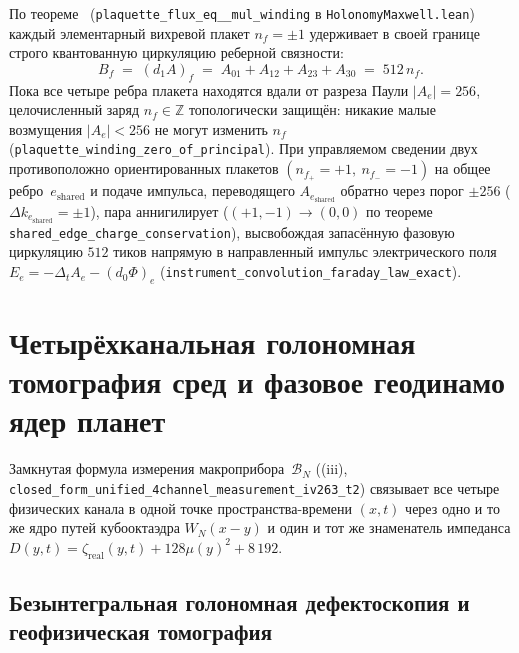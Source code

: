 По теореме~ (\texttt{plaquette\_\allowbreak flux\_\allowbreak eq\_\_\allowbreak mul\_\allowbreak winding} в \texttt{HolonomyMaxwell.lean}) каждый элементарный вихревой плакет $n_f = \pm 1$ удерживает в своей границе строго квантованную циркуляцию реберной связности:
\begin{equation}
\label{eq:applied-plaquette-512-storage}
  B_f \;=\; (d_1 A)_f \;=\; A_{01} + A_{12} + A_{23} + A_{30} \;=\; 512\,n_f.
\end{equation}
Пока все четыре ребра плакета находятся вдали от разреза Паули $|A_e| = 256$, целочисленный заряд $n_f \in \mathbb{Z}$ топологически защищён: никакие малые возмущения $|A_e| < 256$ не могут изменить $n_f$ (\texttt{plaquette\_\allowbreak winding\_\allowbreak zero\_\allowbreak of\_\allowbreak principal}).
При управляемом сведении двух противоположно ориентированных плакетов $(n_{f_+}=+1,\ n_{f_-}=-1)$ на общее ребро~$e_{\mathrm{shared}}$ и подаче импульса, переводящего $A_{e_{\mathrm{shared}}}$ обратно через порог $\pm 256$ ($\Delta k_{e_{\mathrm{shared}}} = \pm 1$), пара аннигилирует ($(+1,-1)\to(0,0)$ по теореме \texttt{shared\_edge\_charge\_conservation}), высвобождая запасённую фазовую циркуляцию $512$ тиков напрямую в направленный импульс электрического поля $E_e = -\Delta_t A_e - (d_0\Phi)_e$ (\texttt{instrument\_\allowbreak convolution\_\allowbreak faraday\_\allowbreak law\_\allowbreak exact}).

\chapter{Четырёхканальная голономная томография сред и фазовое геодинамо ядер планет}
\label{ch:applied-tomography-and-planetary-cores}

Замкнутая формула измерения макроприбора~$\mathcal{B}_N$ ((iii), \texttt{closed\_\allowbreak form\_\allowbreak unified\_\allowbreak 4channel\_\allowbreak measurement\_\allowbreak iv263\_\allowbreak t2}) связывает все четыре физических канала в одной точке пространства-времени $(x,t)$ через одно и то же ядро путей кубооктаэдра $W_N(x-y)$ и один и тот же знаменатель импеданса $D(y,t) = \zeta_{\mathrm{real}}(y,t) + 128\mu(y)^2 + 8\,192$.

\section{Безынтегральная голономная дефектоскопия и геофизическая томография}
\label{sec:applied-holonomic-tomography}

